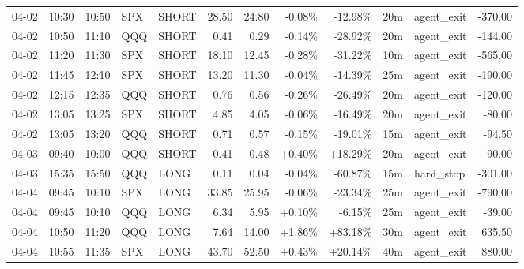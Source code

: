 \documentclass[11pt,a4paper]{article}
\begin{document}
\begin{center}
\begin{longtable}{>{\color{txtmain}}l l l l l r r r r r >{\color{txtmain}}l r}
04-02 & 10:30 & 10:50 & SPX & SHORT & 28.50 & 24.80 & \textcolor{lossred}{-0.08\%} & \textcolor{lossred}{-12.98\%} & 20m & agent\_exit & \textcolor{lossred}{-370.00} \\
04-02 & 10:50 & 11:10 & QQQ & SHORT & 0.41 & 0.29 & \textcolor{lossred}{-0.14\%} & \textcolor{lossred}{-28.92\%} & 20m & agent\_exit & \textcolor{lossred}{-144.00} \\
04-02 & 11:20 & 11:30 & SPX & SHORT & 18.10 & 12.45 & \textcolor{lossred}{-0.28\%} & \textcolor{lossred}{-31.22\%} & 10m & agent\_exit & \textcolor{lossred}{-565.00} \\
04-02 & 11:45 & 12:10 & SPX & SHORT & 13.20 & 11.30 & \textcolor{lossred}{-0.04\%} & \textcolor{lossred}{-14.39\%} & 25m & agent\_exit & \textcolor{lossred}{-190.00} \\
04-02 & 12:15 & 12:35 & QQQ & SHORT & 0.76 & 0.56 & \textcolor{lossred}{-0.26\%} & \textcolor{lossred}{-26.49\%} & 20m & agent\_exit & \textcolor{lossred}{-120.00} \\
04-02 & 13:05 & 13:25 & SPX & SHORT & 4.85 & 4.05 & \textcolor{lossred}{-0.06\%} & \textcolor{lossred}{-16.49\%} & 20m & agent\_exit & \textcolor{lossred}{-80.00} \\
04-02 & 13:05 & 13:20 & QQQ & SHORT & 0.71 & 0.57 & \textcolor{lossred}{-0.15\%} & \textcolor{lossred}{-19.01\%} & 15m & agent\_exit & \textcolor{lossred}{-94.50} \\
04-03 & 09:40 & 10:00 & QQQ & SHORT & 0.41 & 0.48 & \textcolor{wingreen}{+0.40\%} & \textcolor{wingreen}{+18.29\%} & 20m & agent\_exit & \textcolor{wingreen}{90.00} \\
04-03 & 15:35 & 15:50 & QQQ & LONG & 0.11 & 0.04 & \textcolor{lossred}{-0.04\%} & \textcolor{lossred}{-60.87\%} & 15m & hard\_stop & \textcolor{lossred}{-301.00} \\
04-04 & 09:45 & 10:10 & SPX & LONG & 33.85 & 25.95 & \textcolor{lossred}{-0.06\%} & \textcolor{lossred}{-23.34\%} & 25m & agent\_exit & \textcolor{lossred}{-790.00} \\
04-04 & 09:45 & 10:10 & QQQ & LONG & 6.34 & 5.95 & \textcolor{wingreen}{+0.10\%} & \textcolor{lossred}{-6.15\%} & 25m & agent\_exit & \textcolor{lossred}{-39.00} \\
04-04 & 10:50 & 11:20 & QQQ & LONG & 7.64 & 14.00 & \textcolor{wingreen}{+1.86\%} & \textcolor{wingreen}{+83.18\%} & 30m & agent\_exit & \textcolor{wingreen}{635.50} \\
04-04 & 10:55 & 11:35 & SPX & LONG & 43.70 & 52.50 & \textcolor{wingreen}{+0.43\%} & \textcolor{wingreen}{+20.14\%} & 40m & agent\_exit & \textcolor{wingreen}{880.00} \\

\end{longtable}
\end{center}
\end{document}
